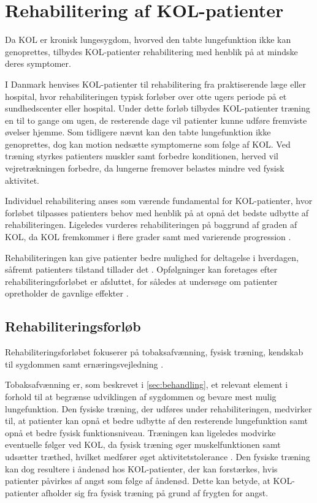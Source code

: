 \section{Rehabilitering af KOL-patienter}
Da KOL er kronisk lungesygdom, hvorved den tabte lungefunktion ikke kan genoprettes, tilbydes KOL-patienter rehabilitering med henblik på at mindske deres symptomer. 

I Danmark henvises KOL-patienter til rehabilitering fra praktiserende læge eller hospital, hvor rehabiliteringen typisk forløber over otte ugers periode på et sundhedscenter eller hospital. Under dette forløb tilbydes KOL-patienter træning en til to gange om ugen, de resterende dage vil patienter kunne udføre fremviste øvelser hjemme.\cite{McCarthy2015,Frausing2011b} Som tidligere nævnt kan den tabte lungefunktion ikke genoprettes, dog kan motion nedsætte symptomerne som følge af KOL. Ved træning styrkes patienters muskler samt forbedre konditionen, herved vil vejretrækningen forbedre, da lungerne fremover belastes mindre ved fysisk aktivitet.\cite{Lungeforeningen2016}

Individuel rehabilitering anses som værende fundamental for KOL-patienter, hvor forløbet tilpasses patienters behov med henblik på at opnå det bedste udbytte af rehabiliteringen.\cite{McCarthy2015,Habraken2011,Sundhedsstyrelsen2015} Ligeledes vurderes rehabiliteringen på baggrund af graden af KOL, da KOL fremkommer i flere grader samt med varierende progression \cite{McCarthy2015}.

Rehabiliteringen kan give patienter bedre mulighed for deltagelse i hverdagen, såfremt patienters tilstand tillader det \cite{McCarthy2015,Habraken2011, Sundhedsstyrelsen2015}. Opfølgninger kan foretages efter rehabiliteringsforløbet er afsluttet, for således at undersøge om patienter opretholder de gavnlige effekter \cite{Frausing2011b}.


\subsection{Rehabiliteringsforløb}
Rehabiliteringsforløbet fokuserer på tobaksafvænning, fysisk træning, kendskab til sygdommen samt ernæringsvejledning \cite{McCarthy2015,Habraken2011,Sundhedsstyrelsen2015}.

Tobaksafvænning er, som beskrevet i \autoref{sec:behandling}, et relevant element i forhold til at begrænse udviklingen af sygdommen og bevare mest mulig lungefunktion. Den fysiske træning, der udføres under rehabiliteringen, medvirker til, at patienter kan opnå et bedre udbytte af den resterende lungefunktion samt opnå et bedre fysisk funktionsniveau.\cite{Sundhedsstyrelsen2015}
Træningen kan ligeledes modvirke eventuelle følger ved KOL, da fysisk træning øger muskelfunktionen samt udsætter træthed, hvilket medfører øget aktivitetstolerance \cite{McCarthy2015}. Den fysiske træning kan dog resultere i åndenød hos KOL-patienter, der kan forstærkes, hvis patienter påvirkes af angst som følge af åndenød. Dette kan betyde, at KOL-patienter afholder sig fra fysisk træning på grund af frygten for angst.\cite{McCarthy2015, Sundhedsstyrelsen2015} 

